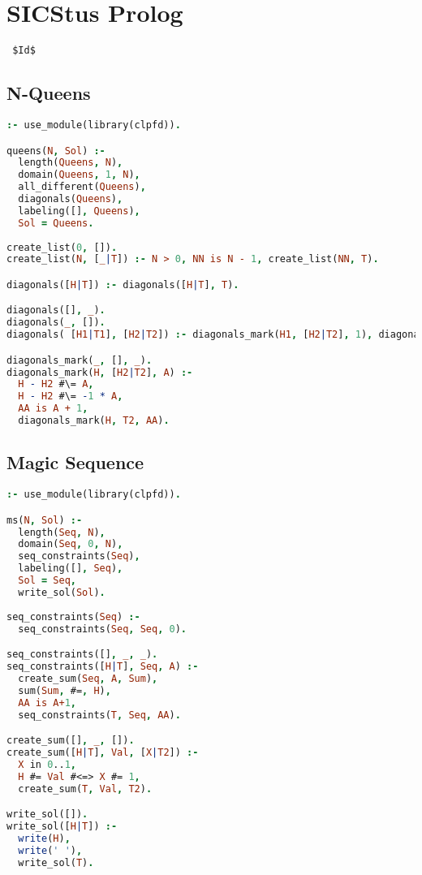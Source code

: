 \section{SICStus Prolog}
\label{implementation:sicstus}
\verb= $Id$ =


\subsection{N-Queens}
\begin{lstlisting}[language=Prolog]
:- use_module(library(clpfd)).

queens(N, Sol) :- 
  length(Queens, N),
  domain(Queens, 1, N),
  all_different(Queens),
  diagonals(Queens),
  labeling([], Queens),
  Sol = Queens.
  
create_list(0, []).
create_list(N, [_|T]) :- N > 0, NN is N - 1, create_list(NN, T).

diagonals([H|T]) :- diagonals([H|T], T).

diagonals([], _).
diagonals(_, []).
diagonals( [H1|T1], [H2|T2]) :- diagonals_mark(H1, [H2|T2], 1), diagonals(T1, T2).

diagonals_mark(_, [], _).
diagonals_mark(H, [H2|T2], A) :-
  H - H2 #\= A,
  H - H2 #\= -1 * A,
  AA is A + 1,
  diagonals_mark(H, T2, AA).
\end{lstlisting}

\subsection{Magic Sequence}
\begin{lstlisting}[language=Prolog]
:- use_module(library(clpfd)).

ms(N, Sol) :-
  length(Seq, N),
  domain(Seq, 0, N),
  seq_constraints(Seq),
  labeling([], Seq),
  Sol = Seq,
  write_sol(Sol).
  
seq_constraints(Seq) :-
  seq_constraints(Seq, Seq, 0).

seq_constraints([], _, _).
seq_constraints([H|T], Seq, A) :-
  create_sum(Seq, A, Sum),
  sum(Sum, #=, H),
  AA is A+1,
  seq_constraints(T, Seq, AA).

create_sum([], _, []).
create_sum([H|T], Val, [X|T2]) :-
  X in 0..1,
  H #= Val #<=> X #= 1,
  create_sum(T, Val, T2).

write_sol([]).  
write_sol([H|T]) :-
  write(H),
  write(' '),
  write_sol(T).
\end{lstlisting}

